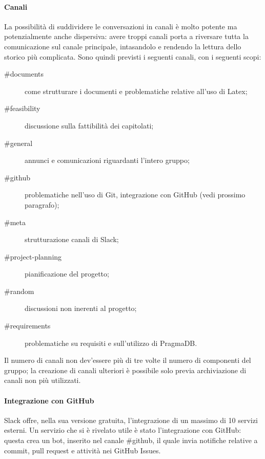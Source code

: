 \paragraph{Canali} La possibilità di suddividere le conversazioni in canali è molto potente ma potenzialmente anche dispersiva: avere troppi canali porta a riversare tutta la comunicazione sul canale principale, intasandolo e rendendo la lettura dello storico più complicata. Sono quindi previsti i seguenti canali, con i seguenti scopi:
\begin{description}
	\item[\#documents] come strutturare i documenti e problematiche relative all'uso di Latex;
	\item[\#feasibility] discussione sulla fattibilità dei capitolati;
	\item[\#general] annunci e comunicazioni riguardanti l'intero gruppo;
	\item[\#github] problematiche nell'uso di Git, integrazione con GitHub (vedi prossimo paragrafo);
	\item[\#meta] strutturazione canali di Slack;
	\item[\#project-planning] pianificazione del progetto;
	\item[\#random] discussioni non inerenti al progetto;
	\item[\#requirements] problematiche su requisiti e sull'utilizzo di PragmaDB.
\end{description}
Il numero di canali non dev'essere più di tre volte il numero di componenti del gruppo; la creazione di canali ulteriori è possibile solo previa archiviazione di canali non più utilizzati.
\paragraph{Integrazione con GitHub} Slack offre, nella sua versione gratuita, l'integrazione di un massimo di 10 servizi esterni. Un servizio che si è rivelato utile è stato l'integrazione con GitHub: questa crea un bot, inserito nel canale \#github, il quale invia notifiche relative a commit, pull request e attività nei GitHub Issues.




